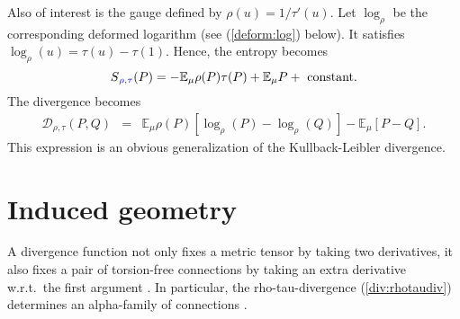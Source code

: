 \documentclass[graybox]{svmult}
\newcommand{\be}{\begin{equation}}
\newcommand{\ee}{\end{equation}}
\newcommand{\beq}{\begin{eqnarray}}
\newcommand{\eeq}{\end{eqnarray}}
\newcommand{\Eo}{\mathbb E}
\newcommand{\Ddiv}{\mathcal{D}}
\newcommand{\add}[1]{{\color{blue}#1}}
\begin{document}
Also of interest is the gauge defined by $\rho(u)=1/\tau'(u)$.
Let $\log_\rho$ be the corresponding deformed logarithm (see (\ref {deform:log}) below).
It satisfies $\log_\rho(u)=\tau(u)-\tau(1)$. Hence, the entropy becomes
\be
S\add{_{\rho,\tau}}(P)=-\Eo_\mu\rho(P)\tau(P)+\Eo_\mu P+\mbox{ constant}.
\nonumber\ee
The divergence becomes
\beq
\Ddiv _{\rho,\tau}(P,Q)
&=&
\Eo_\mu\rho(P)\left[\log_\rho(P)-\log_\rho(Q)\right]-\Eo_\mu\left[P-Q\right].
\nonumber
\eeq
This expression is an obvious generalization of the Kullback-Leibler divergence.


\section{Induced geometry}
\label{sect:geometry}

A divergence function not only fixes a metric tensor by taking two derivatives,
it also fixes a pair of torsion-free connection\add{s} by taking an extra
derivative w.r.t.~the first argument
\cite{eguchi1983} \cite{eguchi1985}. In particular,
the rho-tau-divergence  (\ref {div:rhotaudiv}) determines an alpha-family of
connections \cite{zhang2004a,zhang13,NZ17}.
\end{document}
